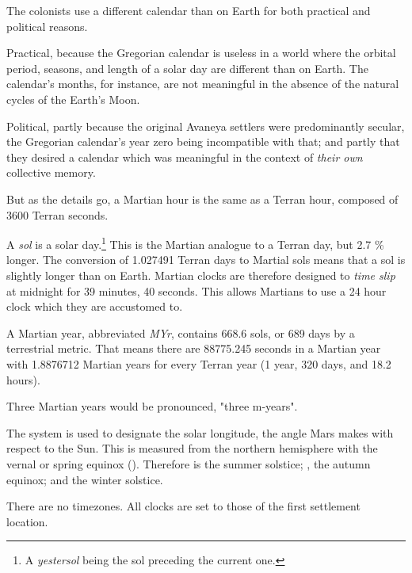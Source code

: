 

The colonists use a different calendar than on Earth for both practical and political reasons.

Practical, because the Gregorian calendar is useless in a world where the orbital period, seasons, and length of a solar day are different than on Earth. The calendar's months, for instance, are not meaningful in the absence of the natural cycles of the Earth's Moon.

Political, partly because the original Avaneya settlers were predominantly secular, the Gregorian calendar's year zero being incompatible with that; and partly that they desired a calendar which was meaningful in the context of {\it their own} collective memory.

But as the details go, a Martian hour is the same as a Terran hour, composed of 3600 Terran seconds.

A {\it sol} is a solar day.\footnote{A {\it yestersol} being the sol preceding the current one.} This is the Martian analogue to a Terran day, but 2.7 \% longer. The conversion of 1.027491 Terran days to Martial sols means that a sol is slightly longer than on Earth. Martian clocks are therefore designed to {\it time slip} at midnight for 39 minutes, 40 seconds. This allows Martians to use a 24 hour clock which they are accustomed to.

A Martian year, abbreviated {\it MYr}, contains 668.6 sols, or 689 days by a terrestrial metric. That means there are 88775.245 seconds in a Martian year with 1.8876712 Martian years for every Terran year (1 year, 320 days, and 18.2 hours). 

Three Martian years would be pronounced, "three m-years".

The  system is used to designate the solar longitude, the angle Mars makes with respect to the Sun. This is measured from the northern hemisphere with the vernal or spring equinox (). Therefore  is the summer solstice; , the autumn equinox; and  the winter solstice.

There are no timezones. All clocks are set to those of the first settlement location.

